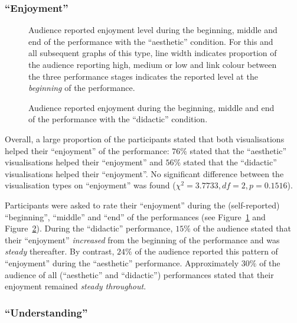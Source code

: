 \documentclass{sig-alternate}
\begin{document}
\subsubsection{``Enjoyment''}

\begin{figure}
  \centering {}
  \caption{Audience reported enjoyment level during the beginning,
    middle and end of the performance with the ``aesthetic''
    condition. For this and all subsequent graphs of this type, line
    width indicates proportion of the audience reporting high, medium
    or low and link colour between the three performance stages
    indicates the reported level at the \textit{beginning} of the
    performance.}
\label{fig:aesthetic-enjoyment}
\end{figure}

\begin{figure}
\centering
{}
\caption{Audience reported enjoyment during the beginning, middle and
  end of the performance with the ``didactic'' condition.}
\label{fig:didactic-enjoyment}
\end{figure}

Overall, a large proportion of the participants stated that both
visualisations helped their ``enjoyment'' of the performance: $76\%$
stated that the ``aesthetic'' visualisations helped their
``enjoyment'' and $56\%$ stated that the ``didactic'' visualisations
helped their ``enjoyment''. No significant difference between the
visualisation types on ``enjoyment'' was found
($\chi^2=3.7733,df=2,p=0.1516$).

Participants were asked to rate their ``enjoyment'' during the
(self-reported) ``beginning'', ``middle'' and ``end'' of the
performances (see Figure~\ref{fig:aesthetic-enjoyment} and
Figure~\ref{fig:didactic-enjoyment}). During the ``didactic''
performance, $15\%$ of the audience stated that their ``enjoyment''
\textit{increased} from the beginning of the performance and was
\textit{steady} thereafter. By contrast, $24\%$ of the audience
reported this pattern of ``enjoyment'' during the ``aesthetic''
performance. Approximately $30\%$ of the audience of all
(``aesthetic'' and ``didactic'') performances stated that their
enjoyment remained \textit{steady throughout}.

\subsubsection{``Understanding''}
\end{document}

